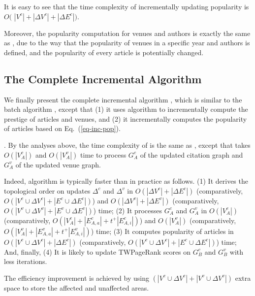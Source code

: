 It is easy to see that the time complexity of incrementally updating popularity is $O($ $|V^c|+|\Delta V^c|+|\Delta E^c|)$.

Moreover, the popularity computation for venues and authors is exactly the same as \batensemble, due to the way that the  popularity of venues in a specific year and authors is defined, and the popularity of every article is potentially changed.


\subsection{The Complete Incremental Algorithm}
\label{subsec-inc-alg}

We finally present the complete incremental algorithm \incensemble, which is similar to the batch algorithm \batensemble, except that (1) it uses algorithm \inctwprscc to incrementally compute the prestige of articles and venues, and (2) it incrementally computes the popularity of articles based on Eq.~(\ref{eq-inc-pop}).



.
By the analyses above, the time complexity of \incensemble is the same as \batensemble, except that \incensemble takes $O(|V^c_A|)$ and $O(|V^v_A|)$ time to process $G^c_A$ of the updated citation graph and $G^v_A$ of the updated  venue graph.

Indeed, algorithm \incensemble is typically faster than \batensemble in practice as follows.
(1) It derives the topological order on updates $\Delta^c$ and $\Delta^v$ in $O(|\Delta V^c|+|\Delta E^c|)$ (comparatively, $O(|V^c\cup\Delta V^c|+|E^c\cup \Delta E^c|)$) and $O(|\Delta V^v|+|\Delta E^v|)$ (comparatively, $O(|V^v\cup \Delta V^v|+|E^v\cup \Delta E^v|)$) time;
(2) It processes $G^c_A$ and $G^v_A$ in $O(|V^c_A|)$ (comparatively, $O(|V^c_A|+|E^c_{A,a}|+t^+|E^c_{A,i}|)$) and $O(|V^v_A|)$ (comparatively, $O(|V^v_A|+|E^v_{A,a}|+t^+|E^v_{A,i}|)$) time;
(3) It computes popularity of articles in $O(|V^c\cup\Delta V^c|+|\Delta E^c|)$ (comparatively, $O(|V^c\cup\Delta V^c|+|E^c\cup \Delta E^c|)$) time;
And, finally, (4) It is likely to update TWPageRank scores on $G^c_B$ and $G^v_B$ with less iterations.

The efficiency improvement is achieved by using $(|V^c\cup\Delta V^c|+|V^v\cup\Delta V^v|)$ extra space to store the affected and unaffected areas.





